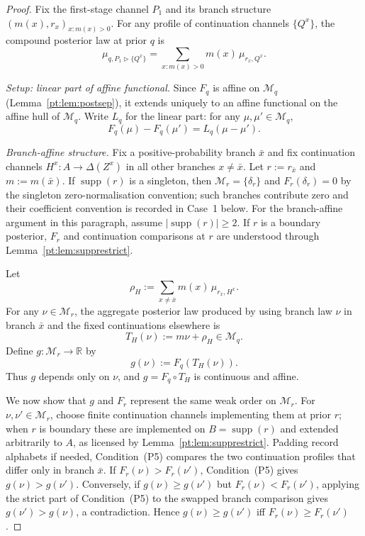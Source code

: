 \documentclass[11pt,a4paper]{article}
\theoremstyle{definition}
\newcommand{\R}{\mathbb R}
\newcommand{\1}{\mathbf 1}
\begin{document}
\begin{proof}
Fix the first-stage channel $P_1$ and its branch structure $(m(x),r_x)_{x:m(x)>0}$.  For any profile of continuation
channels $\{Q^x\}$, the compound posterior law at prior $q$ is
\[
\mu_{q,P_1\triangleright\{Q^x\}}
=
\sum_{x:m(x)>0}m(x)\,\mu_{r_x,Q^x}.
\]

\emph{Setup: linear part of affine functional.}  Since $F_q$ is affine on $\mathcal M_q$ (Lemma~\ref{pt:lem:postsep}),
it extends uniquely to an affine functional on the affine hull of $\mathcal M_q$.  Write $L_q$ for the linear part:
for any $\mu,\mu'\in\mathcal M_q$,
\[
F_q(\mu)-F_q(\mu')=L_q(\mu-\mu').
\]

\emph{Branch-affine structure.}  Fix a positive-probability branch $\bar x$ and fix continuation channels
$H^x:A\to\Delta(Z^x)$ in all other branches $x\ne\bar x$.  Let $r:=r_{\bar x}$ and $m:=m(\bar x)$.  If
$\operatorname{supp}(r)$ is a singleton, then $\mathcal M_r=\{\delta_r\}$ and $F_r(\delta_r)=0$ by the singleton
zero-normalisation convention; such branches contribute zero and their coefficient convention is recorded in
Case~1 below.  For the branch-affine argument in this paragraph, assume $|\operatorname{supp}(r)|\ge2$.  If $r$ is a
boundary posterior, $F_r$ and continuation comparisons at $r$ are understood through Lemma~\ref{pt:lem:supprestrict}.

Let
\[
\rho_H:=\sum_{x\ne\bar x}m(x)\,\mu_{r_x,H^x}.
\]
For any $\nu\in\mathcal M_r$, the aggregate posterior law produced by using branch law $\nu$ in branch $\bar x$ and
the fixed continuations elsewhere is
\[
T_H(\nu):=m\nu+\rho_H\in\mathcal M_q.
\]
Define $g:\mathcal M_r\to\R$ by
\[
g(\nu):=F_q(T_H(\nu)).
\]
Thus $g$ depends only on $\nu$, and $g=F_q\circ T_H$ is continuous and affine.

We now show that $g$ and $F_r$ represent the same weak order on $\mathcal M_r$.  For $\nu,\nu'\in\mathcal M_r$, choose
finite continuation channels implementing them at prior $r$; when $r$ is boundary these are implemented on
$B=\operatorname{supp}(r)$ and extended arbitrarily to $A$, as licensed by Lemma~\ref{pt:lem:supprestrict}.  Padding record
alphabets if needed, Condition~\textup{(P5)} compares the two continuation profiles that differ only in branch $\bar x$.
If $F_r(\nu)>F_r(\nu')$, Condition~\textup{(P5)} gives $g(\nu)>g(\nu')$.  Conversely, if $g(\nu)\ge g(\nu')$ but
$F_r(\nu)<F_r(\nu')$, applying the strict part of Condition~\textup{(P5)} to the swapped branch comparison gives
$g(\nu')>g(\nu)$, a contradiction.  Hence $g(\nu)\ge g(\nu')$ iff $F_r(\nu)\ge F_r(\nu')$.


\end{proof}
\end{document}
